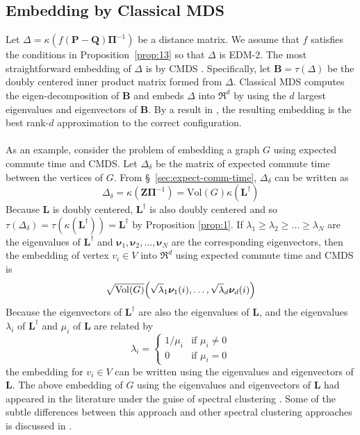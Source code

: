 \documentclass[10pt,twocolumn]{article}
\numberwithin{equation}{section}
\begin{document}
\subsection{Embedding by Classical MDS}
\label{sec:embedd-class-mds}
Let $\Delta = \kappa(f(\mathbf{P} - \mathbf{Q})\bm{\Pi}^{-1})$ be a
distance matrix. We assume that $f$ satisfies the conditions in
Proposition~\ref{prop:13} so that $\Delta$ is EDM-2. The most
straightforward embedding of $\Delta$ is by CMDS
\cite{gower66:_some,torgesen52:_multid}. Specifically, let $\mathbf{B}
= \tau(\Delta)$ be the doubly centered inner product matrix
formed from $\Delta$. Classical MDS computes the eigen-decomposition of
$\mathbf{B}$ and embeds $\Delta$ into $\Re^{d}$ by using
the $d$ largest eigenvalues and eigenvectors of $\mathbf{B}$. By a
result in \cite{eckart36:_approx}, the resulting embedding is the
best rank-$d$ approximation to the correct configuration. \\ \\
\noindent
As an example, consider the problem of embedding a graph $G$ using
expected commute time and CMDS. Let $\Delta_\delta$ be the
matrix of expected commute time between the vertices of $G$. From
\S~\ref{sec:expect-comm-time}, $\Delta_{\delta}$ can be written as
\begin{equation*}
  \Delta_{\delta} = \kappa(\mathbf{Z}\bm{\Pi}^{-1}) = \mathrm{Vol}(G)
  \kappa(\mathbf{L}^{\dagger})
\end{equation*}
Because $\mathbf{L}$ is doubly centered, $\mathbf{L}^{\dagger}$ is
also doubly centered and so $\tau(\Delta_{\delta}) =
\tau(\kappa(\mathbf{L}^{\dagger})) = \mathbf{L}^{\dagger}$ by
Proposition \ref{prop:1}. If $\lambda_1 \geq \lambda_2 \geq \dots \geq
\lambda_N$ are the eigenvalues of $\mathbf{L}^{\dagger}$ and
$\bm{\nu}_1, \bm{\nu}_2, \dots, \bm{\nu}_N$ are the corresponding
eigenvectors, then the embedding of vertex $v_i \in V$ into
$\Re^{d}$ using expected commute time and CMDS is
\begin{equation}
  \label{eq:9}
  \sqrt{\mathrm{Vol}(G)} 
\Bigl(\sqrt{\lambda}_1 \bm{\nu}_1(i), \dots, \sqrt{\lambda}_d \bm{\nu}_d(i) \Bigr)
\end{equation}
Because the eigenvectors of $\mathbf{L}^{\dagger}$ are also the
eigenvalues of $\mathbf{L}$, and the eigenvalues $\lambda_i$ of  
$\mathbf{L}^{\dagger}$ and $\mu_i$ of $\mathbf{L}$ are related by
\begin{equation}
  \label{eq:19}
  \lambda_i = \begin{cases}
    1/\mu_i & \text{if $\mu_i \not = 0$} \\
    0 & \text{if $\mu_i = 0$}
    \end{cases}
\end{equation}
the embedding for $v_i \in V$ can be written using the eigenvalues and
eigenvectors of $\mathbf{L}$. The above embedding of $G$ using the
eigenvalues and eigenvectors of
$\mathbf{L}$ had appeared in the literature under the guise of
spectral clustering \cite{yen07:_graph}. Some of the subtle differences between this approach and other 
spectral clustering approaches is discussed in \cite{luxburg07:_tutor_spect_clust}. 
\end{document}
